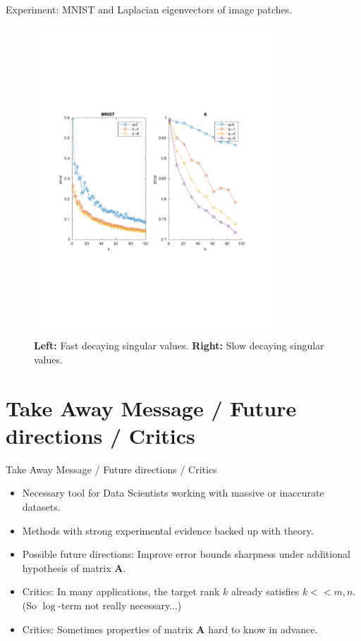 \documentclass{beamer}
\newcommand{\mtx}[1]{\bm{#1}}
\begin{document}
\begin{frame}{Experiment: MNIST and Laplacian eigenvectors of image patches.}
\begin{figure}[H] \label{fig:exp2}
\begin{center}
\includegraphics[width=0.8\textwidth, trim=0cm 8cm 0cm 7cm, clip=true]{../report/figures/2-1.pdf}
\end{center}
\caption{\textbf{Left:} Fast decaying singular values. \textbf{Right:} Slow decaying singular
values.}
\end{figure}
\end{frame}


\section{Take Away Message / Future directions / Critics}
\begin{frame}{Take Away Message / Future directions / Critics}
\begin{itemize}
  \item Necessary tool for Data Scientists working with massive or inaccurate 
  datasets.
  \item Methods with strong experimental evidence backed up with theory.
  \item Possible future directions: Improve error bounds sharpness under
  additional hypothesis
  of matrix $\mtx{A}$.
  \item Critics: In many applications, the target rank $k$ already
  satisfies $k<<m,n$. (So $\log$-term not really necessary...)
  \item Critics: Sometimes properties of matrix $\mtx{A}$ hard to know
  in advance.


\end{itemize}
\end{frame}
\end{document}
